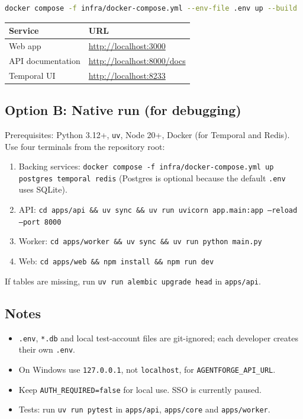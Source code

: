 \documentclass[11pt,a4paper]{article}
\begin{document}
\begin{lstlisting}[language=bash]
docker compose -f infra/docker-compose.yml --env-file .env up --build
\end{lstlisting}

\begin{longtable}{@{}L{4cm}L{8cm}@{}}
\toprule
\textbf{Service} & \textbf{URL} \\
\midrule
Web app & \url{http://localhost:3000} \\
API documentation & \url{http://localhost:8000/docs} \\
Temporal UI & \url{http://localhost:8233} \\
\bottomrule
\end{longtable}

\subsection{Option B: Native run (for debugging)}

Prerequisites: Python 3.12+, \texttt{uv}, Node 20+, Docker (for Temporal and Redis).
Use four terminals from the repository root:

\begin{enumerate}[nosep]
  \item Backing services: \texttt{docker compose -f infra/docker-compose.yml up postgres temporal redis} (Postgres is optional because the default \texttt{.env} uses SQLite).
  \item API: \texttt{cd apps/api \&\& uv sync \&\& uv run uvicorn app.main:app --reload --port 8000}
  \item Worker: \texttt{cd apps/worker \&\& uv sync \&\& uv run python main.py}
  \item Web: \texttt{cd apps/web \&\& npm install \&\& npm run dev}
\end{enumerate}

If tables are missing, run \texttt{uv run alembic upgrade head} in \texttt{apps/api}.

\subsection{Notes}

\begin{itemize}[nosep]
  \item \texttt{.env}, \texttt{*.db} and local test-account files are git-ignored; each developer creates their own \texttt{.env}.
  \item On Windows use \texttt{127.0.0.1}, not \texttt{localhost}, for \texttt{AGENTFORGE\_API\_URL}.
  \item Keep \texttt{AUTH\_REQUIRED=false} for local use. SSO is currently paused.
  \item Tests: run \texttt{uv run pytest} in \texttt{apps/api}, \texttt{apps/core} and \texttt{apps/worker}.
\end{itemize}
\end{document}
